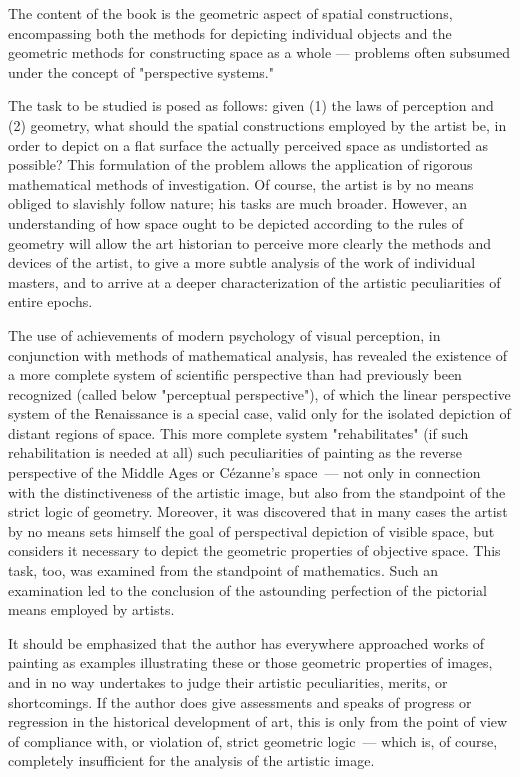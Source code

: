 The content of the book is the geometric aspect of spatial constructions, encompassing
both the methods for depicting individual objects and the geometric methods for
constructing space as a whole — problems often subsumed under the concept of
"perspective systems."

The task to be studied is posed as follows: given (1) the laws of perception and (2)
geometry, what should the spatial constructions employed by the artist be, in order to
depict on a flat surface the actually perceived space as undistorted as possible? This
formulation of the problem allows the application of rigorous mathematical methods of
investigation. Of course, the artist is by no means obliged to slavishly follow nature; his
tasks are much broader. However, an understanding of how space ought to be depicted
according to the rules of geometry will allow the art historian to perceive more clearly
the methods and devices of the artist, to give a more subtle analysis of the work of
individual masters, and to arrive at a deeper characterization of the artistic peculiarities
of entire epochs.

The use of achievements of modern psychology of visual perception, in conjunction with
methods of mathematical analysis, has revealed the existence of a more complete system
of scientific perspective than had previously been recognized (called below "perceptual
perspective"), of which the linear perspective system of the Renaissance is a special case,
valid only for the isolated depiction of distant regions of space. This more complete
system "rehabilitates" (if such rehabilitation is needed at all) such peculiarities of
painting as the reverse perspective of the Middle Ages or Cézanne's space~--- not only
in connection with the distinctiveness of the artistic image, but also from the standpoint
of the strict logic of geometry. Moreover, it was discovered that in many cases the artist
by no means sets himself the goal of perspectival depiction of visible space, but considers
it necessary to depict the geometric properties of objective space. This task, too, was
examined from the standpoint of mathematics. Such an examination led to the conclusion
of the astounding perfection of the pictorial means employed by artists.

It should be emphasized that the author has everywhere approached works of painting
as examples illustrating these or those geometric properties of images, and in no way
undertakes to judge their artistic peculiarities, merits, or shortcomings. If the author
does give assessments and speaks of progress or regression in the historical development
of art, this is only from the point of view of compliance with, or violation of, strict
geometric logic~--- which is, of course, completely insufficient for the analysis of the
artistic image.

